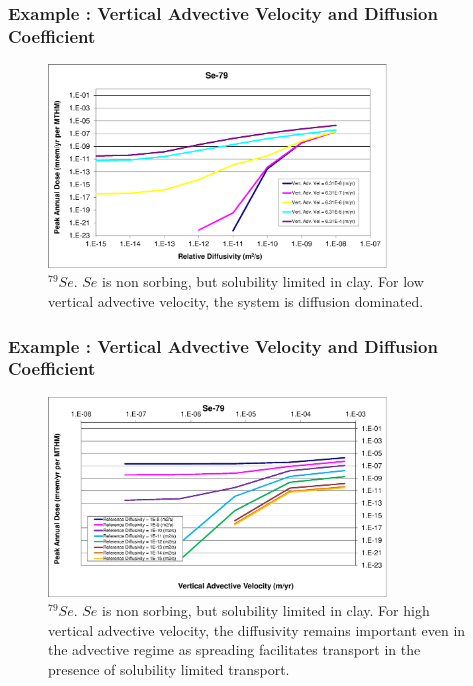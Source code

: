 \begin{frame}[c]
  \frametitle{Example : Vertical Advective Velocity and Diffusion Coefficient}
\begin{figure}[htp!]
\centering
\includegraphics[width=0.8\textwidth]{./images/Se-79.eps}
\caption{$^{79}Se$.  $Se$ is non sorbing, but solubility limited in clay.  For low vertical advective velocity, the system is diffusion dominated.}
\label{fig:VAdvVelSe79}
\end{figure}
\end{frame}

\begin{frame}[c]
  \frametitle{Example : Vertical Advective Velocity and Diffusion Coefficient}
\begin{figure}[ht!]
\centering
\includegraphics[width=0.8\textwidth]{./images/Se-79-VAdvVel.eps}
\caption{$^{79}Se$.
$Se$ is non sorbing, but solubility limited in clay.
For high vertical advective 
velocity, the diffusivity remains important even in the advective regime as 
spreading facilitates transport in the presence of solubility limited 
transport.} 
\label{fig:VAdvVelSe79VAdvVel}
\end{figure}
\end{frame}

